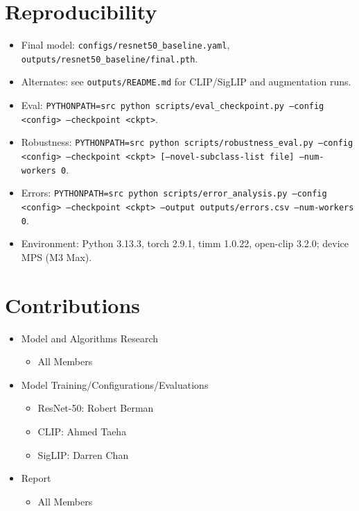 \documentclass{article}
\begin{document}
\section{Reproducibility}
\begin{itemize}
    \item Final model: \texttt{configs/resnet50\_baseline.yaml}, \texttt{outputs/resnet50\_baseline/final.pth}.
    \item Alternates: see \texttt{outputs/README.md} for CLIP/SigLIP and augmentation runs.
    \item Eval: \texttt{PYTHONPATH=src python scripts/eval\_checkpoint.py --config <config> --checkpoint <ckpt>}.
    \item Robustness: \texttt{PYTHONPATH=src python scripts/robustness\_eval.py --config <config> --checkpoint <ckpt> [--novel-subclass-list file] --num-workers 0}.
    \item Errors: \texttt{PYTHONPATH=src python scripts/error\_analysis.py --config <config> --checkpoint <ckpt> --output outputs/errors.csv --num-workers 0}.
    \item Environment: Python 3.13.3, torch 2.9.1, timm 1.0.22, open-clip 3.2.0; device MPS (M3 Max).
\end{itemize}

\section{Contributions}
\begin{itemize}
    \item Model and Algorithms Research
    \begin{itemize}
        \item All Members
    \end{itemize}

    \item Model Training/Configurations/Evaluations
    \begin{itemize}
        \item ResNet-50: Robert Berman
        \item CLIP: Ahmed Taeha
        \item SigLIP: Darren Chan
    \end{itemize}

    \item Report
    \begin{itemize}
        \item All Members
    \end{itemize}
\end{itemize}


\end{document}
